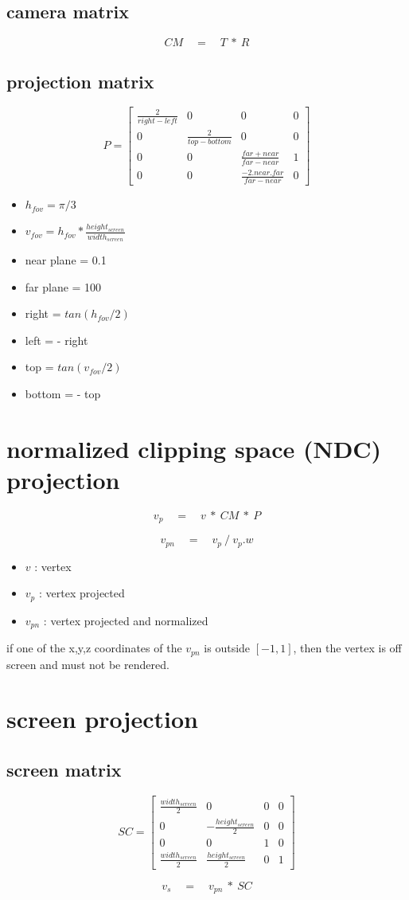 \documentclass[12pt]{article}
\begin{document}
\subsection {camera matrix}

$$
CM \quad = \quad T \ * \ R
$$


\subsection {projection matrix}

$$
P = 
\begin{bmatrix}
\frac{2}{right - left} & 0 & 0 & 0 \\
0 & \frac{2}{top - bottom} & 0 & 0 \\
0 & 0 & \frac{far + near}{far - near} & 1 \\
0 & 0 & \frac{-2 . near . far}{far - near} & 0
\end{bmatrix}
$$

\begin{itemize}
\item $h_{fov} = \pi / 3$
\item $v_{fov} = h_{fov} * \frac{height_{screen}}{width_{screen}}$
\item near plane = 0.1
\item far plane = 100
\item right = $tan(h_{fov} / 2)$
\item left = - right
\item top = $tan(v_{fov} / 2)$
\item bottom = - top
\end{itemize}

\newpage

\section{normalized clipping space (NDC) projection}

$$ v_{p} \quad = \quad v \ * \ CM \ * \ P $$

$$ v_{pn} \quad = \quad v_{p} \ / \ v_{p}.w  $$

\begin{itemize}
\item $v$ : vertex
\item $v_{p}$ : vertex projected
\item $v_{pn}$ : vertex projected and normalized
\end{itemize}

if one of the x,y,z coordinates of the $v_{pn}$ is outside $[-1, 1]$, then the vertex is off screen and must not be rendered. 

\section{screen projection}

\subsection{screen matrix}

$$
SC =
\begin{bmatrix}
\frac{width_{screen}}{2} & 0 & 0 & 0 \\
0 & - \frac{height_{screen}}{2} & 0 & 0 \\
0 & 0 & 1 & 0 \\
\frac{width_{screen}}{2} & \frac{height_{screen}}{2} & 0 & 1
\end{bmatrix}
$$

$$v_s \quad = \quad v_{pn} \ * \ SC $$
\end{document}
